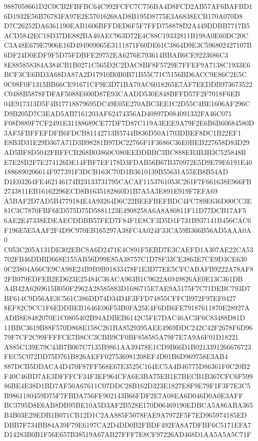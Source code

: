 \documentclass[UTF8,fontset=fandol,zihao=-4,a4paper]{ctexart}
\begin{document}
{{9887058661D2C0CB2FBFBC64C992FCFC7C756BA4D8FCD2AB57AF6BAFBD16D1932E56B76783FA97E2E57016268AD8B195D8775E3A6838ECB170A070D8
D7C26252DA6361190EAB1606BFFDED6F5F7FFD758878D2A449DDBB7717B5ACD5842EC18D37DE882BA40AEC963D72E4C88C19332811B198A0E60DC20C
C3A48E679E7906E16D494909065E3111871F60DE61C3864D9E3C596802427107B6DF24D0EDF9F5D75FDBFE29752EA6276E793614BBAB6CE9223686C3
8E885858384A384CB1B0271C565D2C2DAC8BF8F5729E7FFEF9A7138C1933E6BCF3CE6BD3A68DA87A2D17910B0B0B71B55C71C5156BD6ACC9E86C2E5C
0C08F0F1315BB66CE91671CF9E3D71BA79AC6018265E7AF7EEDDB973673522C0488B5878FDFAF5088E600D87E93CAADD530E848BFFD57F2F7018F6EB
04E917313D5F4B17718879695DC49E05E270ABC3EE1C2D55C4BE1606AF296CD9B205D7C3EAD5AB7161203AF62474356AD40897D084091332FA46C071
F08D889F7CF2491E31188689CE77DF7D87C119A3EEE9A79F2E6B6B60684580D3AF5FBFFEFDFB6FDCB81142713B5744B836D50A1703DBEF8DC1B22EF1
E8B3D31E29D367A71D3B98281B97DC22766F1F3686C36E0BEB227658D83D29AD5BF8D5042FBFFCB268B03860C080EEDDBBC3BC888EB3B3B3C525848B
E7E28B2F7E274126DE14FBF7EF178D3FDAB56B67B370972E5D9E79E6191E401886890206614F977391F3DCB163C70D1B3610139B55631A55EB8B54AD
D1E03264FE462146174B23133731795CACAF1153761053C261F7F661638E966FB2743811EB16162296ECD8B1635182860D1B7A5A3E891E919F7EFA69
A5BAF2D7AD5B4779184E4A93264D6C22BEEFBEFBDC4FC789E636D00CC3E81C3C7870FBF6ED575D75D5881123E4908258A6A8A80811F11D77DCB17AF5
6AE2E47338EDEAECDDBB57FED7F84F1E8CF3D5D1F731B937141B456CAC6F196E5E5AAF2F4D9C970EB165297A38FC4A024F33CA59B366B56AD5AAA0A0
C053C205A131DE302EBC8A6D2471E4C891F5EBD7E3CAEFD1A307AE22CA53702FB46DDBD668E155AB56D99E85A38757C1D78F33CE3863E7CE9D3CE630
0C23804A66CE9CA98E24B9B9B91833478F1E3D77EE5CFCABAFB9222A78AF82FB979EDFEB2ED623E25484C36ACA963B1C9622A6949826AE0E13C361DB
A4B42A6269615B050F2962A28585883D1686715E7AE9A5175F7C71DEBC793D7BF614C9D56AE3C561C386DD74D34D4F3FFD74855CFFCB972F97EF0427
8EF82C9CC1F6EDDBEB1646E06F53B0FA25E4F6DB6FE79187611870E28927AADB8E8482070E1C0805402B94ADBEB6142C5FE7DAC46AC3F6C83488D81D
11BBC3619B88F570D868E158C261BA8529395AEE4969DDC242C42F2678F6D9679F7CF2C99FFFFCE7B8CC3CBB9CF0BF858585A79F7E7A9A6F01D18221
A885C139E79C43B7B067C7135B9861AA39478E1CD9B66D1B0213391266676723FEC5C072DD75D761B826AEFF027536981208EF4D01B6D969758E3AB4
887DCB5DDACA4D470F87FF568E67E3525C164EC5A4B46775D86361F0C20B2F40C46BD7AE3DFFFCF34F3EF964CFA6E3BA75EB1E7BECB1B367CFC6F599
86BE4E38D1BD7AF50A67611C07DDC28B162D323E1827E8F9E79F1F3F7E3C5B9861180459D75F7FBDA756FF902143B66FDF2E7A08EA6D046D0A0E3AFF
BC3795D8E6AB8DB95BE10A5D3AF2B528E170D06469190EDBCA5A86ABA365B4B03E29EDB1B071CB12D1C2AA885F5078FAE9A7972F5F7ED965974185ED
DBB7F734BB84A39F79E6197CA2D4DD0B2FBDF492FA8A7DFBF6C5171EFA7D14283B0B1F56E657B38519A67AB27FFF7E8CF97226AD468D1AA5A5A5C71F
}}
\end{document}
